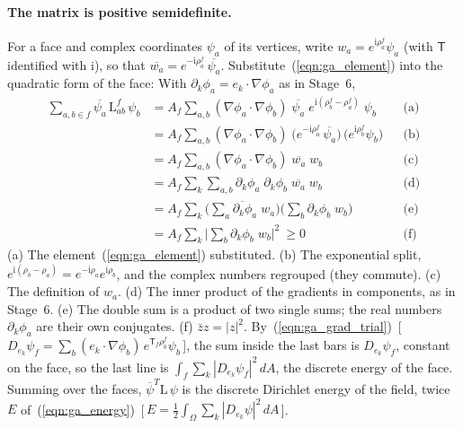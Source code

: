 \paragraph{The matrix is positive semidefinite.} For a face and complex coordinates $\psi_a$ of its vertices, write $w_a = e^{\mathrm i\rho_a^f}\psi_a$ (with $\mathsf T$ identified with $\mathrm i$), so that $\overline{w_a} = e^{-\mathrm i\rho_a^f}\,\overline{\psi_a}$. Substitute~(\ref{eqn:ga_element}) into the quadratic form of the face:
With $\partial_k\phi_a = e_k\cdot\nabla\phi_a$ as in Stage~6,
\begin{align*}
\sum_{a, b\in f}\overline{\psi_a}\,\mathrm L^f_{ab}\,\psi_b &= A_f\sum_{a,b}(\nabla\phi_a\cdot\nabla\phi_b)\;\overline{\psi_a}\; e^{\mathrm i(\rho_b^f - \rho_a^f)}\;\psi_b && \text{(a)} \\
&= A_f\sum_{a,b}(\nabla\phi_a\cdot\nabla\phi_b)\;\big(e^{-\mathrm i\rho_a^f}\,\overline{\psi_a}\big)\,\big(e^{\mathrm i\rho_b^f}\psi_b\big) && \text{(b)} \\
&= A_f\sum_{a,b}(\nabla\phi_a\cdot\nabla\phi_b)\;\overline{w_a}\; w_b && \text{(c)} \\
&= A_f\sum_k\sum_{a,b}\partial_k\phi_a\;\partial_k\phi_b\;\overline{w_a}\; w_b && \text{(d)} \\
&= A_f\sum_k\Big(\overline{\sum_a \partial_k\phi_a\; w_a}\Big)\Big(\sum_b \partial_k\phi_b\; w_b\Big) && \text{(e)} \\
&= A_f\sum_k\Big|\sum_b \partial_k\phi_b\; w_b\Big|^2 \ \ge 0 && \text{(f)}
\end{align*}
(a) The element~(\ref{eqn:ga_element}) substituted. (b) The exponential split, $e^{\mathrm i(\rho_b - \rho_a)} = e^{-\mathrm i\rho_a}e^{\mathrm i\rho_b}$, and the complex numbers regrouped (they commute). (c) The definition of $w_a$. (d) The inner product of the gradients in components, as in Stage~6. (e) The double sum is a product of two single sums; the real numbers $\partial_k\phi_a$ are their own conjugates. (f) $\bar z z = |z|^2$.
By~(\ref{eqn:ga_grad_trial})~[\,$D_{e_k}\psi_f = \sum_b(e_k\cdot\nabla\phi_b)\, e^{\mathsf T_f\rho_b^f}\psi_b$\,], the sum inside the last bars is $D_{e_k}\psi_f$, constant on the face, so the last line is $\int_f\sum_k|D_{e_k}\psi_f|^2\, dA$, the discrete energy of the face. Summing over the faces, $\overline\psi^T\mathrm L\,\psi$ is the discrete Dirichlet energy of the field, twice $E$ of~(\ref{eqn:ga_energy})~[\,$E = \frac12\int_\Omega\sum_k|D_{e_k}\psi|^2\, dA$\,].

